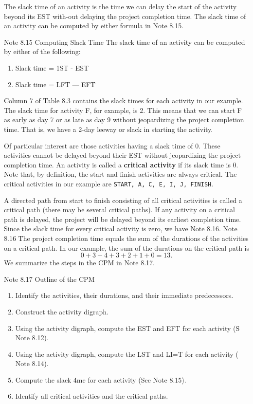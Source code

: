 \documentclass{article}
\begin{document}
The slack time of an activity is the time we can delay the start of the activity beyond its EST with-out delaying the project completion time. 
The slack time of an activity can be computed by either formula in Note 8.15. 
\begin{framed} Note 8.15 Computing Slack Time The slack time of an activity can be computed by either of the following: 
\begin{enumerate}
    \item Slack time = 1ST - EST 
\item Slack time = LFT — EFT 
\end{enumerate}

\end{framed}
Column 7 of Table 8.3 contains the slack times for each activity in our example. 
The slack time for activity F, for example, is 2. 
This means that we can start F as early as day 7 or as late as day 9 without jeopardizing the project completion time. 
That is, we have a 2-day leeway or slack in starting the activity. 

Of particular interest are those activities having a slack time of 0. These activities 
cannot be delayed beyond their EST without jeopardizing the project completion time. 
An activity is called a \textbf{critical activity} if its slack time is 0. Note that, by definition, the 
start and finish activities are always critical. The critical activities in our example are 
\texttt{START, A, C, E, I, J, FINISH}. 

A directed path from start to finish consisting of all critical 
activities is called a critical path (there may be several critical paths). If any activity on 
a critical path is delayed, the project will be delayed beyond its earliest completion 
time. 
Since the slack time for every critical activity is zero, we have Note 8.16. 
Note 8.16 
The project completion time equals the sum of the durations of the activities 
on a critical path. 
In our example, the sum of the durations on the critical path is 
\[ 0 + 3 + 4 + 3 + 2 + 1 + 0 = 13. \]
We summarize the steps in the CPM in Note 8.17. 
\begin{framed}
Note 8.17 Outline of the CPM 
\begin{enumerate}
    \item  Identify the activities, their durations, and their immediate predecessors. 
\item Construct the activity digraph. 
\item Using the activity digraph, compute the EST and EFT for each activity (S 
Note 8.12). 
\item  Using the activity digraph, compute the LST and LI=T for each activity ( 
Note 8.14). 
\item Compute the slack 4me for each activity (See Note 8.15). 
\item Identify all critical activities and the critical paths.
\end{enumerate}
 
\end{framed}
\end{document}
